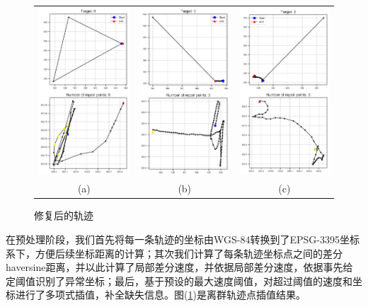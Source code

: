 \documentclass[UTF8, 12pt]{ctexart}
\begin{document}
		\begin{figure}[H]
			\centering
			\begin{tabular}{ccc}
				\includegraphics[width=0.27\linewidth]{..//plots//traj_filtering_396.png} & \includegraphics[width=0.27\linewidth]{..//plots//traj_filtering_691.png} &
				\includegraphics[width=0.27\linewidth]{..//plots//traj_filtering_1093.png} \\
				(a) & (b) & (c)
			\end{tabular}
			\caption{修复后的轨迹}
			\label{sec_2_fig_0}
			\vspace{-0.2cm}
		\end{figure}
		在预处理阶段，我们首先将每一条轨迹的坐标由WGS-84转换到了EPSG-3395坐标系下，方便后续坐标距离的计算；其次我们计算了每条轨迹坐标点之间的差分haversine距离，并以此计算了局部差分速度，并依据局部差分速度，依据事先给定阈值识别了异常坐标；最后，基于预设的最大速度阈值，对超过阈值的速度和坐标进行了多项式插值，补全缺失信息。图(\ref{sec_2_fig_0})是离群轨迹点插值结果。
\end{document}
